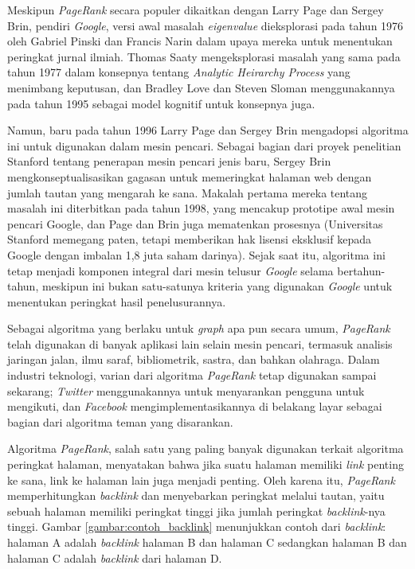 Meskipun \textit{PageRank} secara populer dikaitkan dengan Larry Page dan Sergey Brin, pendiri \textit{Google}, versi awal masalah \textit{eigenvalue} dieksplorasi pada tahun 1976 oleh Gabriel Pinski dan Francis Narin dalam upaya mereka untuk menentukan peringkat jurnal ilmiah. Thomas Saaty mengeksplorasi masalah yang sama pada tahun 1977 dalam konsepnya tentang \textit{Analytic Heirarchy Process} yang menimbang keputusan, dan Bradley Love dan Steven Sloman menggunakannya pada tahun 1995 sebagai model kognitif untuk konsepnya juga.

Namun, baru pada tahun 1996 Larry Page dan Sergey Brin mengadopsi algoritma ini untuk digunakan dalam mesin pencari. Sebagai bagian dari proyek penelitian Stanford tentang penerapan mesin pencari jenis baru, Sergey Brin mengkonseptualisasikan gagasan untuk memeringkat halaman web dengan jumlah tautan yang mengarah ke sana. Makalah pertama mereka tentang masalah ini diterbitkan pada tahun 1998, yang mencakup prototipe awal mesin pencari Google, dan Page dan Brin juga mematenkan prosesnya (Universitas Stanford memegang paten, tetapi memberikan hak lisensi eksklusif kepada Google dengan imbalan 1,8 juta saham darinya). Sejak saat itu, algoritma ini tetap menjadi komponen integral dari mesin telusur \textit{Google} selama bertahun-tahun, meskipun ini bukan satu-satunya kriteria yang digunakan \textit{Google} untuk menentukan peringkat hasil penelusurannya.

Sebagai algoritma yang berlaku untuk \textit{graph} apa pun secara umum, \textit{PageRank} telah digunakan di banyak aplikasi lain selain mesin pencari, termasuk analisis jaringan jalan, ilmu saraf, bibliometrik, sastra, dan bahkan olahraga. Dalam industri teknologi, varian dari algoritma \textit{PageRank} tetap digunakan sampai sekarang; \textit{Twitter} menggunakannya untuk menyarankan pengguna untuk mengikuti, dan \textit{Facebook} mengimplementasikannya di belakang layar sebagai bagian dari algoritma teman yang disarankan.

Algoritma \textit{PageRank}, salah satu yang paling banyak digunakan terkait algoritma peringkat halaman, menyatakan bahwa jika suatu halaman memiliki \textit{link} penting ke sana, link ke halaman lain juga menjadi penting. Oleh karena itu, \textit{PageRank} memperhitungkan \textit{backlink} dan menyebarkan peringkat melalui tautan, yaitu sebuah halaman memiliki peringkat tinggi jika jumlah peringkat \textit{backlink}-nya tinggi. Gambar \ref{gambar:contoh_backlink} menunjukkan contoh dari \textit{backlink}: halaman A adalah \textit{backlink} halaman B dan halaman C sedangkan halaman B dan halaman C adalah \textit{backlink} dari halaman D.

